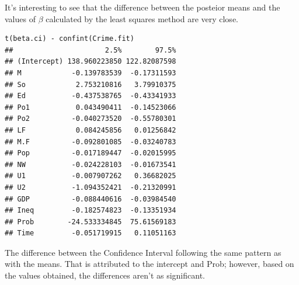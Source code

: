 \documentclass{article}\usepackage[]{graphicx}\usepackage[]{color}
\makeatletter
\newenvironment{kframe}{%
 \def\at@end@of@kframe{}%
 \ifinner\ifhmode%
  \def\at@end@of@kframe{\end{minipage}}%
  \begin{minipage}{\columnwidth}%
 \fi\fi%
 \def\FrameCommand##1{\hskip\@totalleftmargin \hskip-\fboxsep
 \colorbox{shadecolor}{##1}\hskip-\fboxsep
     \hskip-\linewidth \hskip-\@totalleftmargin \hskip\columnwidth}%
 \MakeFramed {\advance\hsize-\width
   \@totalleftmargin\z@ \linewidth\hsize
   \@setminipage}}%
 {\par\unskip\endMakeFramed%
 \at@end@of@kframe}
\newenvironment{knitrout}{}{} %
\makeatother
\begin{document}
It's interesting to see that the difference between the posteior means and the values of $\beta$ calculated by the least squares method are very close. 
\begin{knitrout}
\color{fgcolor}\begin{kframe}
\begin{verbatim}
t(beta.ci) - confint(Crime.fit)
##                      2.5%        97.5%
## (Intercept) 138.960223850 122.82087598
## M            -0.139783539  -0.17311593
## So            2.753210816   3.79910375
## Ed           -0.437538765  -0.43341933
## Po1           0.043490411  -0.14523066
## Po2          -0.040273520  -0.55780301
## LF            0.084245856   0.01256842
## M.F          -0.092801085  -0.03240783
## Pop          -0.017189447  -0.02015995
## NW           -0.024228103  -0.01673541
## U1           -0.007907262   0.36682025
## U2           -1.094352421  -0.21320991
## GDP          -0.088440616  -0.03984540
## Ineq         -0.182574823  -0.13351934
## Prob        -24.533334845  75.61569183
## Time         -0.051719915   0.11051163
\end{verbatim}
\end{kframe}
\end{knitrout}
The difference between the Confidence Interval following the same pattern as with the means. That is attributed to the intercept and Prob; however, based on the values obtained, the differences aren't as significant.
\end{document}
